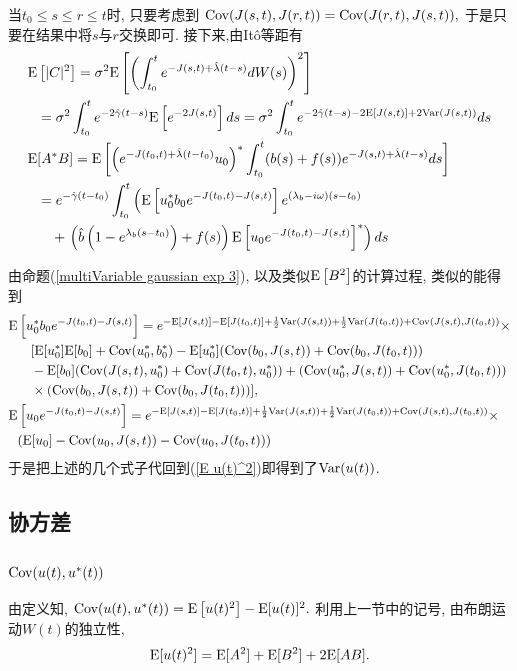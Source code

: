 \documentclass[notitlepage,cs4size,punct,oneside]{ctexrep}
\numberwithin{equation}{section}
\theoremstyle{mystyle}
\begin{document}
当$t_0 \leqslant s \leqslant r \leqslant t$时, 只要考虑到
$
\text{Cov}(J(s, t), J(r, t)) = \text{Cov}(J(r, t), J(s, t)),
$
于是只要在结果中将$s$与$r$交换即可. 接下来,由It\^o等距有
\[
\begin{split}
\text{E}&\left[|C|^2\right] = \sigma^2\text{E}\left[\left(\int_{t_0}^t e^{-J(s, t)+\hat{\lambda}(t-s)}dW(s)\right)^2\right] \\
&= \sigma^2\int_{t_0}^te^{-2\hat\gamma(t-s)}\text{E}\left[e^{-2J(s, t)}\right]ds = \sigma^2\int_{t_0}^t e^{-2\hat\gamma(t-s)-2\text{E}[J(s, t)]+2\text{Var}(J(s, t))}ds \\
\text{E}&[A^*B] = \text{E}\left[\left(e^{-J(t_0, t)+\hat{\lambda}(t-t_0)}u_0\right)^*\int_{t_0}^t(b(s)+f(s))e^{-J(s, t)+\hat{\lambda}(t-s)}ds\right]\\
&= e^{-\hat\gamma(t-t_0)}\int_{t_0}^t \left(\text{E}\left[u_0^*b_0e^{-J(t_0, t)-J(s, t)}\right]e^{(\lambda_b-i\omega)(s-t_0)}\right.\\
&\quad+\left.\left(\hat{b}\left(1-e^{\lambda_b(s-t_0)}\right)+f(s)\right)\text{E}\left[u_0e^{-J(t_0, t)-J(s, t)}\right]^*\right)ds
\end{split}
\]

由命题(\ref{multiVariable gaussian exp 3}), 以及类似$\text{E}\left[B^2\right]$的计算过程, 类似的能得到
\[
\begin{split}
\text{E}&\left[u_0^*b_0e^{-J(t_0, t)-J(s, t)}\right] = e^{-\text{E}[J(s, t)]-\text{E}[J(t_0, t)]+\frac{1}{2}\text{Var}(J(s, t))+\frac{1}{2}\text{Var}(J(t_0, t))+\text{Cov}(J(s, t), J(t_0, t))}\times \\
&\quad[\text{E}[u_0^*]\text{E}[b_0]+\text{Cov}(u_0^*, b_0^*) - \text{E}[u_0^*](\text{Cov}(b_0, J(s, t))+\text{Cov}(b_0, J(t_0, t))) \\
&\quad-\text{E}[b_0](\text{Cov}(J(s, t), u_0^*)+\text{Cov}(J(t_0, t), u_0^*))+(\text{Cov}(u_0^*, J(s, t))+\text{Cov}(u_0^*, J(t_0, t))) \\
&\quad\times(\text{Cov}(b_0, J(s, t))+\text{Cov}(b_0, J(t_0, t)))], \\
\text{E}&\left[u_0e^{-J(t_0, t)-J(s, t)}\right] = e^{-\text{E}[J(s, t)]-\text{E}[J(t_0, t)]+\frac{1}{2}\text{Var}(J(s, t))+\frac{1}{2}\text{Var}(J(t_0, t))+\text{Cov}(J(s, t), J(t_0, t))}\times \\
&(\text{E}[u_0]-\text{Cov}(u_0, J(s, t))-\text{Cov}(u_0, J(t_0, t)))
\end{split}
\]
于是把上述的几个式子代回到(\ref{E u(t)^2})即得到了$\text{Var}(u(t))$.

\subsection{协方差}
\subsubsection{$\text{Cov}(u(t), u^*(t))$}
由定义知,
$
\text{Cov}(u(t), u^*(t)) = \text{E}\left[u(t)^2\right]-\text{E}[u(t)]^2.
$
利用上一节中的记号, 由布朗运动$W(t)$的独立性,
\[
\text{E}[u(t)^2] = \text{E}[A^2]+\text{E}[B^2]+2\text{E}[AB].
\]
\end{document}
